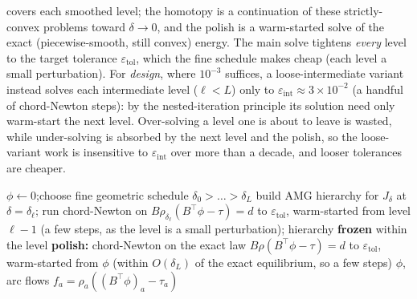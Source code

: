 \documentclass[ijoc]{informs3}
\begin{document}
 covers each smoothed level; the homotopy is a continuation of these strictly-convex problems
toward $\delta\to0$, and the polish is a warm-started solve of the exact (piecewise-smooth, still convex) energy. The main solve tightens \emph{every} level to the target tolerance $\varepsilon_{\mathrm{tol}}$, which the fine schedule makes cheap (each level a small perturbation). For \emph{design}, where $10^{-3}$ suffices, a loose-intermediate variant instead solves each intermediate level ($\ell<L$) only to $\varepsilon_{\mathrm{int}}\approx3\times10^{-2}$ (a handful of chord-Newton steps): by the nested-iteration principle its solution need only warm-start the next level. Over-solving a level one is about to leave is wasted, while under-solving is absorbed by the next level and the polish, so the loose-variant work is insensitive to $\varepsilon_{\mathrm{int}}$ over more than a decade, and looser tolerances are cheaper.

\begin{algorithm}
\caption{Near-linear directed-UE solve (cold start). A \emph{fine} geometric $\delta$-schedule (ratio $0.85$, from $\delta_0=\tfrac12\bar t^0$ down to $\delta_L\approx8\times10^{-9}\bar t^0$) makes each level a small, well-conditioned perturbation of the last, so solving \emph{every} level to the target tolerance $\varepsilon_{\mathrm{tol}}$ ($10^{-9}$ in our runs) reaches machine precision without stalling. A loose-intermediate variant ($\varepsilon_{\mathrm{int}}=3\times10^{-2}$ at intermediate levels) reaches $\sim10^{-3}$ faster, which is all design requires (\cref{sec:results}).}\label{alg:solve}
\begin{algorithmic}[1]
\State $\phi\gets 0$;\quad choose fine geometric schedule $\delta_0>\dots>\delta_L$
 
  \State build AMG hierarchy for $J_\delta$ at $\delta=\delta_\ell$; run chord-Newton on
  $B\rho_{\delta_\ell}(B^\top\phi-\tau)=d$ to $\varepsilon_{\mathrm{tol}}$, warm-started from level $\ell-1$
  (a few steps, as the level is a small perturbation); hierarchy \textbf{frozen} within the level
\EndFor
\State \textbf{polish:} chord-Newton on the exact law $B\rho(B^\top\phi-\tau)=d$ to $\varepsilon_{\mathrm{tol}}$, warm-started from $\phi$
(within $O(\delta_L)$ of the exact equilibrium, so a few steps)
\State \Return $\phi$, arc flows $f_a=\rho_a((B^\top\phi)_a-\tau_a)$
\end{algorithmic}
\end{algorithm}
\end{document}
